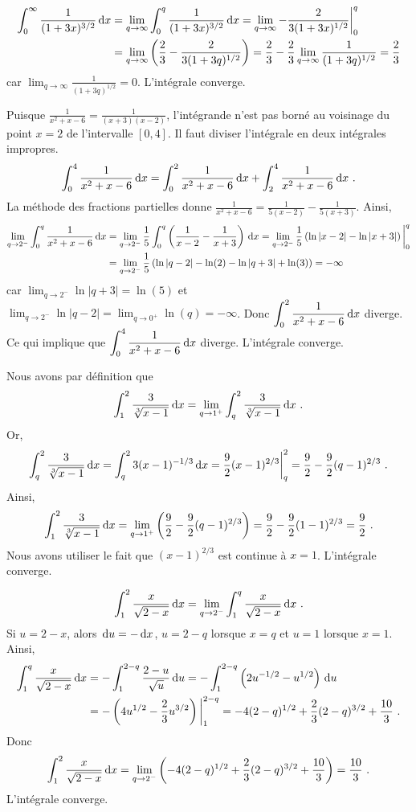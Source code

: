 {
\begin{align*}
\int_0^\infty \frac{1}{(1+3x)^{3/2}} \,\mathrm{d}x &=
\lim_{q\to \infty} \int_0^q \frac{1}{(1+3x)^{3/2}} \,\mathrm{d}x
= \lim_{q\to \infty} -\frac{2}{3(1+3x)^{1/2}} \bigg|_0^q \\
&= \lim_{q\to \infty} \left( \frac{2}{3} -\frac{2}{3(1+3q)^{1/2}} \right)
= \frac{2}{3} - \frac{2}{3} \lim_{q\to \infty} \frac{1}{(1+3q)^{1/2}}
= \frac{2}{3}
\end{align*}
car $\displaystyle \lim_{q\to \infty} \frac{1}{(1+3q)^{1/2}} = 0$.
L'intégrale converge.

Puisque $\displaystyle \frac{1}{x^2+x-6} = \frac{1}{(x+3)(x-2)}$,
l'intégrande n'est pas borné au voisinage du point $x=2$ de l'intervalle
$[0,4]$.  Il faut diviser l'intégrale en deux intégrales impropres.
\[
\int_0^4 \frac{1}{x^2+x-6} \dx{x} =
\int_0^2 \frac{1}{x^2+x-6} \dx{x} + \int_2^4 \frac{1}{x^2+x-6} \dx{x} \ .
\]
La méthode des fractions partielles donne
$\displaystyle \frac{1}{x^2+x-6} = \frac{1}{5(x-2)} - \frac{1}{5(x+3)}$.
Ainsi,
\begin{align*}
\lim_{q\to 2^-} \int_0^q \frac{1}{x^2+x-6} \,\mathrm{d}x &=
\lim_{q\to 2^-} \frac{1}{5}
\int_0^q \left( \frac{1}{x-2} - \frac{1}{x+3}\right)\,\mathrm{d}x
= \lim_{q\to 2^-} \frac{1}{5} \left( \ln|x-2| - \ln|x+3|\right)\bigg|_0^q \\
&= \lim_{q\to 2^-} \frac{1}{5} \left( \ln|q-2| -\ln(2) - \ln|q+3| +
\ln(3)\right) = -\infty
\end{align*}
car $\displaystyle \lim_{q\to 2^-} \ln|q+3| = \ln(5)$ et
$\displaystyle \lim_{q\to 2^-} \ln|q-2| = \lim_{q\to 0^+} \ln(q) = -\infty$.
Donc $\displaystyle \int_0^2 \frac{1}{x^2+x-6} \,\mathrm{d}x$ diverge.  Ce qui
implique que $\displaystyle \int_0^4 \frac{1}{x^2+x-6} \,\mathrm{d}x$ diverge.
L'intégrale converge.

 Nous avons par définition que
\[
\int_1^2\frac{3}{\sqrt[3]{x-1}} \,\mathrm{d}x = \lim_{q\to 1^+}
\int_q^2\frac{3}{\sqrt[3]{x-1}} \,\mathrm{d}x \ .
\]
Or,
\[
\int_q^2\frac{3}{\sqrt[3]{x-1}} \,\mathrm{d}x
= \int_q^2 3(x-1)^{-1/3} \,\mathrm{d}x = \frac{9}{2} (x-1)^{2/3}\bigg|_q^2
= \frac{9}{2} - \frac{9}{2} (q-1)^{2/3} \ .
\]
Ainsi,
\[
\int_1^2\frac{3}{\sqrt[3]{x-1}} \,\mathrm{d}x = \lim_{q\to 1^+}
\left( \frac{9}{2} - \frac{9}{2} (q-1)^{2/3} \right)
=\frac{9}{2} - \frac{9}{2} (1-1)^{2/3} = \frac{9}{2} \ .
\]
Nous avons utiliser le fait que $(x-1)^{2/3}$ est continue à $x=1$.
L'intégrale converge.

\[
\int_1^2 \frac{x}{\sqrt{2-x}} \,\mathrm{d}x
= \lim_{q\to 2^-} \int_1^q \frac{x}{\sqrt{2-x}} \,\mathrm{d}x \ .
\]
Si $u=2-x$, alors $\,\mathrm{d}u = -\,\mathrm{d}x$, $u=2-q$ lorsque
$x=q$ et $u=1$ lorsque $x=1$.  Ainsi,
\begin{align*}
\int_1^q \frac{x}{\sqrt{2-x}} \,\mathrm{d}x
&= -\int_1^{2-q} \frac{2-u}{\sqrt{u}} \,\mathrm{d}u
= -\int_1^{2-q} \left( 2u^{-1/2} - u^{1/2} \right) \,\mathrm{d}u \\
&= -\left( 4 u^{1/2} - \frac{2}{3}u^{3/2} \right) \bigg|_1^{2-q} 
= -4(2-q)^{1/2} + \frac{2}{3} (2-q)^{3/2} + \frac{10}{3}  \ .
\end{align*}
Donc
\[
\int_1^2 \frac{x}{\sqrt{2-x}} \,\mathrm{d}x
= \lim_{q\to 2^-}
\left( -4(2-q)^{1/2} + \frac{2}{3} (2-q)^{3/2} + \frac{10}{3}\right) 
= \frac{10}{3} \ .
\]
L'intégrale converge.

}

